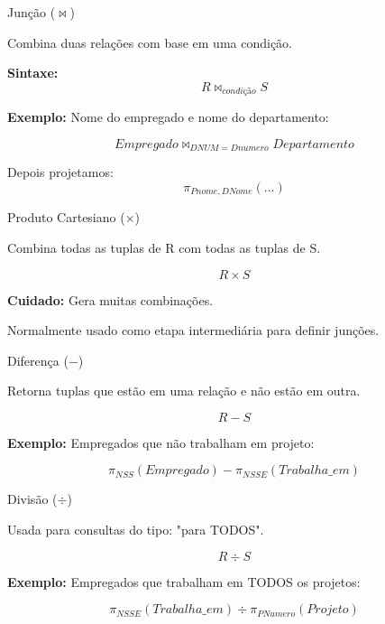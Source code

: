 \documentclass{beamer}
\begin{document}
\begin{frame}{Junção ($\Join$)}

Combina duas relações com base em uma condição.

\textbf{Sintaxe:}
\[
R \Join_{condição} S
\]

\textbf{Exemplo:}
Nome do empregado e nome do departamento:

\[
Empregado \Join_{DNUM=Dnumero} Departamento
\]

Depois projetamos:
\[
\pi_{Pnome, DNome}(...)
\]

\end{frame}





\begin{frame}{Produto Cartesiano ($\times$)}

Combina todas as tuplas de R com todas as tuplas de S.

\[
R \times S
\]

\textbf{Cuidado:}
Gera muitas combinações.

Normalmente usado como etapa intermediária
para definir junções.

\end{frame}





\begin{frame}{Diferença ($-$)}

Retorna tuplas que estão em uma relação
e não estão em outra.

\[
R - S
\]

\textbf{Exemplo:}
Empregados que não trabalham em projeto:

\[
\pi_{NSS}(Empregado) -
\pi_{NSSE}(Trabalha\_em)
\]

\end{frame}





\begin{frame}{Divisão ($\div$)}

Usada para consultas do tipo:
"para TODOS".

\[
R \div S
\]

\textbf{Exemplo:}
Empregados que trabalham em TODOS os projetos:

\[
\pi_{NSSE}(Trabalha\_em) \div
\pi_{PNumero}(Projeto)
\]

\end{frame}
\end{document}
